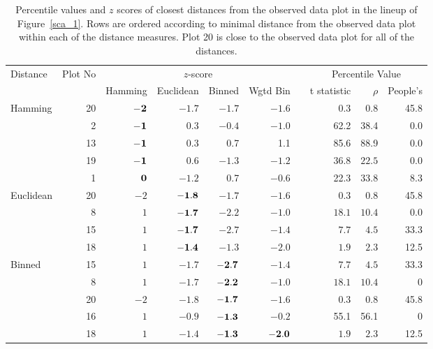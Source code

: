 \documentclass[12]{report}
\begin{document}
\begin{table}[hbt]
	\vspace{-.1in}
\caption{Percentile values and $z$ scores of closest distances from the observed data plot in the lineup of Figure~\ref{sca_1}. Rows are ordered according to minimal distance from the observed data plot within each of the distance measures. Plot 20 is close to the observed data plot for all  of the distances.}
%
\centering  %
\begin{tabular}{l r rrrr r rrr}  %
\hline                       %
Distance & Plot No &\multicolumn{4}{c}{$z$-score} & &\multicolumn{3}{c}{Percentile Value} \\ [0.5ex]   
 \cline{1-1}\cline{3-6}\cline{8-10}
 & & Hamming & Euclidean & Binned & Wgtd Bin & & t statistic & $\rho$ & People's   \\     [0.5ex]
\hline
Hamming  & 20 & $\bf -2$ & $-1.7$ & $-1.7$ & $-1.6$ & & 0.3 & 0.8 & 45.8 \\[-0.5ex]
 & 2 & $\bf -1$ & 0.3 & $-0.4$ & $-1.0$ & & 62.2 & 38.4 & 0.0\\[-0.5ex]
 & 13 & $\bf  -1$ & 0.3 & 0.7 & 1.1 & & 85.6 & 88.9 & 0.0 \\[-0.5ex]
& 19 & $\bf -1$ & $0.6$ & $-1.3$ & $-1.2$ &  & $36.8$ & $22.5$ & 0.0 \\[-0.5ex]
 & 1 & $\bf 0$ & $-1.2$ & 0.7 & $-0.6$ & & 22.3 & 33.8 & 8.3 \\[1ex]

Euclidean  & 20 & $-2$ & $\bf -1.8$ & $-1.7$ & $-1.6$ & & $0.3$ & $0.8$  & 45.8 \\[-0.5ex]
		 & 8 & $ 1$ & $\bf -1.7$ & $-2.2$ & $-1.0$ & & $18.1$ & $10.4$ & 0.0 \\[-0.5ex]
 		& 15 & $1$ & $\bf -1.7$ & $-2.7$ & $ -1.4$ & & $7.7$ & $4.5$ & 33.3\\[-0.5ex]
 		& 18 & $1$ & $\bf -1.4$ & $-1.3$ & $ -2.0$ & & $1.9$ & $2.3$ & 12.5\\[1ex]

Binned  & 15 & $1$ & $-1.7$ & $\bf -2.7$ & $ -1.4$ & & $7.7$ & $4.5$ & 33.3\\[-0.5ex]
	    & 8 & $ 1$ & $-1.7$ & $\bf -2.2$ & $-1.0$ & & $18.1$ & $10.4$ & 0 \\[-0.5ex]
	   & 20 & $-2$ & $-1.8$ & $\bf -1.7$ & $ -1.6$ & & $0.3$ & $0.8$ & 45.8 \\[-0.5ex]
 		& 16  & $1$ & $-0.9$ & $\bf -1.3$ & $-0.2$ & & 55.1 & 56.1 & 0\\[-0.5ex]
		& 18 & $1$ & $-1.4$ & $\bf -1.3$ & $\bf -2.0$ & & $1.9$ & $2.3$ & 12.5\\[1ex]


\end{tabular}
\end{table}
\end{document}

